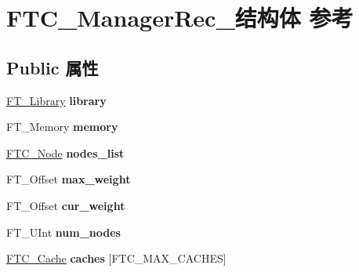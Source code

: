 \hypertarget{struct_f_t_c___manager_rec__}{}\section{F\+T\+C\+\_\+\+Manager\+Rec\+\_\+结构体 参考}
\label{struct_f_t_c___manager_rec__}
\subsection*{Public 属性}
\begin{DoxyCompactItemize}
\item 
\mbox{\label{struct_f_t_c___manager_rec___ac4679515b99c81a420ea87e56090e3ae}} 
\hyperlink{struct_f_t___library_rec__}{F\+T\+\_\+\+Library} {\bfseries library}
\item 
\mbox{\label{struct_f_t_c___manager_rec___a6dc4a419a2baab7cd2e4e53bbbd4a615}} 
F\+T\+\_\+\+Memory {\bfseries memory}
\item 
\mbox{\label{struct_f_t_c___manager_rec___ab620c724228740e1d4a763c1b66063cc}} 
\hyperlink{struct_f_t_c___node_rec__}{F\+T\+C\+\_\+\+Node} {\bfseries nodes\+\_\+list}
\item 
\mbox{\label{struct_f_t_c___manager_rec___a9eb90214e3354d15230a84ad26a69ded}} 
F\+T\+\_\+\+Offset {\bfseries max\+\_\+weight}
\item 
\mbox{\label{struct_f_t_c___manager_rec___a372aa28c86e3b42205eaaf9b80f6d1de}} 
F\+T\+\_\+\+Offset {\bfseries cur\+\_\+weight}
\item 
\mbox{\label{struct_f_t_c___manager_rec___acb4e07c3ab5aefc6ab3b13a47afa13d9}} 
F\+T\+\_\+\+U\+Int {\bfseries num\+\_\+nodes}
\item 
\mbox{\label{struct_f_t_c___manager_rec___a14cd0320b72265b1c0b037d779495f99}} 
\hyperlink{struct_f_t_c___cache_rec__}{F\+T\+C\+\_\+\+Cache} {\bfseries caches} \mbox{[}F\+T\+C\+\_\+\+M\+A\+X\+\_\+\+C\+A\+C\+H\+ES\mbox{]}
\item 
\mbox{\label{struct_f_t_c___manager_rec___a01415be8a05cc14bc91bfa56d8f4e004}} 

\end{DoxyCompactItemize}
